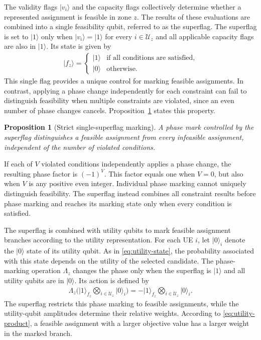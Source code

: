 \documentclass[journal]{IEEEtran}
\newtheorem{proposition}{Proposition}
\newcommand{\ket}[1]{\lvert #1 \rangle}
\begin{document}
{{The validity flags $\ket{v_i}$ and the capacity flags collectively determine whether a represented assignment is feasible in zone $z$.
The results of these evaluations are combined into a single feasibility qubit, referred to as the superflag. The superflag is set to
$\ket{1}$ only when $\ket{v_i}=\ket{1}$ for every $i\in\mathcal{U}_z$ and all applicable capacity flags are also in $\ket{1}$. Its state is given by
\begin{align}
\ket{f_z}
=\begin{cases}
\ket{1} &\text{if all conditions are satisfied},\\
\ket{0} & \text{otherwise}.
\end{cases}
\label{eq:superflag}
\end{align}
This single flag provides a unique control for marking feasible assignments. In contrast, applying a phase change independently for each constraint can fail to distinguish feasibility when multiple constraints are violated, since an even number of phase changes cancels. Proposition~\ref{prop:superflag} states this property.

\begin{proposition}[Strict single-superflag marking]
\label{prop:superflag}
A phase mark controlled by the superflag distinguishes a feasible assignment from every infeasible assignment, independent of the number of violated conditions.
\end{proposition}

\begin{IEEEproof}
If each of $V$ violated conditions independently applies a phase change, the resulting phase factor is $(-1)^V$. This factor equals one when $V=0$, but also when $V$ is any positive even integer. Individual phase marking cannot uniquely distinguish feasibility. The superflag instead combines all constraint results before phase marking and reaches its marking state only when every condition is satisfied.
\end{IEEEproof}

The superflag is combined with utility qubits to mark feasible assignment branches according to the utility representation. For each UE $i$, let $\ket{0}_i$ denote the $\ket{0}$ state of its utility qubit. As in \eqref{eq:utility-state}, the probability associated with this state depends on the utility of the selected candidate. The phase-marking operation $\Lambda_z$ changes the phase only when the superflag is $\ket{1}$ and all utility qubits are in $\ket{0}$. Its action is defined by
\begin{align}
\Lambda_z\Big(\ket{1}_{f_z}\bigotimes_{i\in\mathcal{U}_z}\ket{0}_i\Big)
=-\ket{1}_{f_z}\bigotimes_{i\in\mathcal{U}_z}\ket{0}_i.
\label{eq:phase-marking}
\end{align}
The superflag restricts this phase marking to feasible assignments, while the utility-qubit amplitudes determine their relative weights. According to \eqref{eq:utility-product}, a feasible assignment with a larger objective value has a larger weight in the marked branch.

}}
\end{document}
